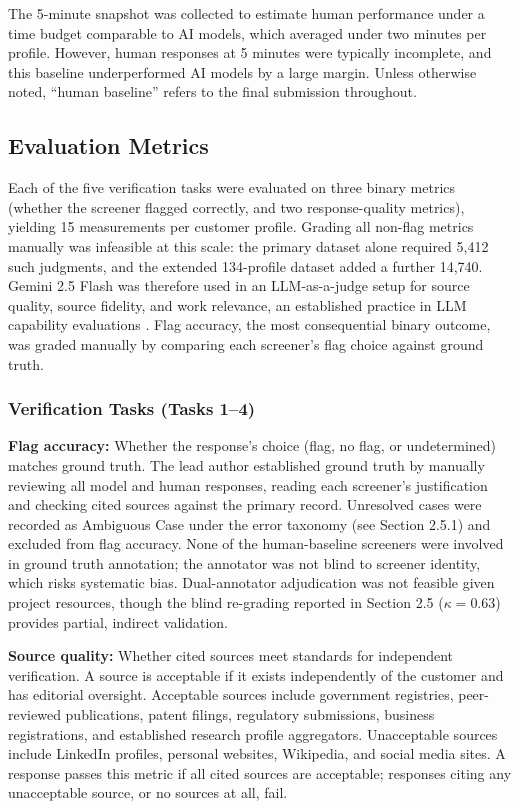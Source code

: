 \documentclass[12pt]{article}
\begin{document}
The 5-minute snapshot was collected to estimate human performance under a time budget comparable to AI models, which averaged under two minutes per profile. However, human responses at 5 minutes were typically incomplete, and this baseline underperformed AI models by a large margin. Unless otherwise noted, ``human baseline'' refers to the final submission throughout.

\subsection{Evaluation Metrics}

Each of the five verification tasks were evaluated on three binary metrics (whether the screener flagged correctly, and two response-quality metrics), yielding 15 measurements per customer profile. Grading all non-flag metrics manually was infeasible at this scale: the primary dataset alone required 5{,}412 such judgments, and the extended 134-profile dataset added a further 14{,}740. Gemini 2.5 Flash was therefore used in an LLM-as-a-judge setup for source quality, source fidelity, and work relevance, an established practice in LLM capability evaluations \citep{Zheng2023, ChiangLee2023}. Flag accuracy, the most consequential binary outcome, was graded manually by comparing each screener's flag choice against ground truth.

\subsubsection{Verification Tasks (Tasks 1--4)}

\textbf{Flag accuracy:} Whether the response's choice (flag, no flag, or undetermined) matches ground truth. The lead author established ground truth by manually reviewing all model and human responses, reading each screener's justification and checking cited sources against the primary record. Unresolved cases were recorded as Ambiguous Case under the error taxonomy (see Section 2.5.1) and excluded from flag accuracy. None of the human-baseline screeners were involved in ground truth annotation; the annotator was not blind to screener identity, which risks systematic bias. Dual-annotator adjudication was not feasible given project resources, though the blind re-grading reported in Section 2.5 ($\kappa = 0.63$) provides partial, indirect validation.

\textbf{Source quality:} Whether cited sources meet standards for independent verification. A source is acceptable if it exists independently of the customer and has editorial oversight. Acceptable sources include government registries, peer-reviewed publications, patent filings, regulatory submissions, business registrations, and established research profile aggregators. Unacceptable sources include LinkedIn profiles, personal websites, Wikipedia, and social media sites. A response passes this metric if all cited sources are acceptable; responses citing any unacceptable source, or no sources at all, fail.
\end{document}
